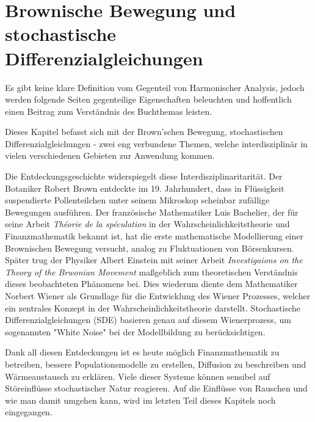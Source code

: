%
%
%
%
\chapter{Brownische Bewegung und stochastische Differenzialgleichungen\label{chapter:brown}}
\begin{refsection}

Es gibt keine klare Definition vom Gegenteil von Harmonischer Analysis, jedoch werden folgende Seiten gegenteilige Eigenschaften beleuchten und hoffentlich einen Beitrag zum Verständnis des Buchthemas leisten.


Dieses Kapitel befasst sich mit der Brown'schen Bewegung, stochastischen Differenzialgleichungen - zwei eng verbundene Themen, welche interdisziplinär in vielen verschiedenen Gebieten zur Anwendung kommen.

Die Entdeckungsgeschichte widerspiegelt diese Interdisziplinaritarität. Der Botaniker Robert Brown entdeckte im 19. Jahrhundert, dass in Flüssigkeit suspendierte Pollenteilchen unter seinem Mikroskop scheinbar zufällige Bewegungen ausführen. Der französische Mathematiker Luis Bachelier, der für seine Arbeit \glqq \textit{Théorie de la spéculation}\glqq{} in der Wahrscheinlichkeitstheorie und Finanzmathematik bekannt ist, hat die erste mathematische Modellierung einer Brownischen Bewegung versucht, analog zu Fluktuationen von Börsenkursen. Später trug der Physiker Albert Einstein mit seiner Arbeit \glqq \textit{Investigaions on the Theory of the Brwonian Movement}\glqq{} maßgeblich zum theoretischen Verständnis dieses beobachteten Phänomens bei. Dies wiederum diente dem Mathematiker Norbert Wiener als Grundlage für die Entwicklung des Wiener Prozesses, welcher ein zentrales Konzept in der Wahrscheinlichkeitstheorie darstellt. Stochastische Differenzialgleichungen (SDE) basieren genau auf diesem Wienerprozess, um sogenannten "White Noise"  bei der Modellbildung zu berücksichtigen. 

Dank all diesen Entdeckungen ist es heute möglich Finanzmathematik zu betreiben, bessere Populationsmodelle zu erstellen, Diffusion zu beschreiben und Wärmeaustausch zu erklären. Viele dieser Systeme können sensibel auf Störeinflüsse stochastischer Natur reagieren. Auf die Einflüsse von Rauschen und wie man damit umgehen kann, wird im letzten Teil dieses Kapitels noch eingegangen.



\end{refsection}
